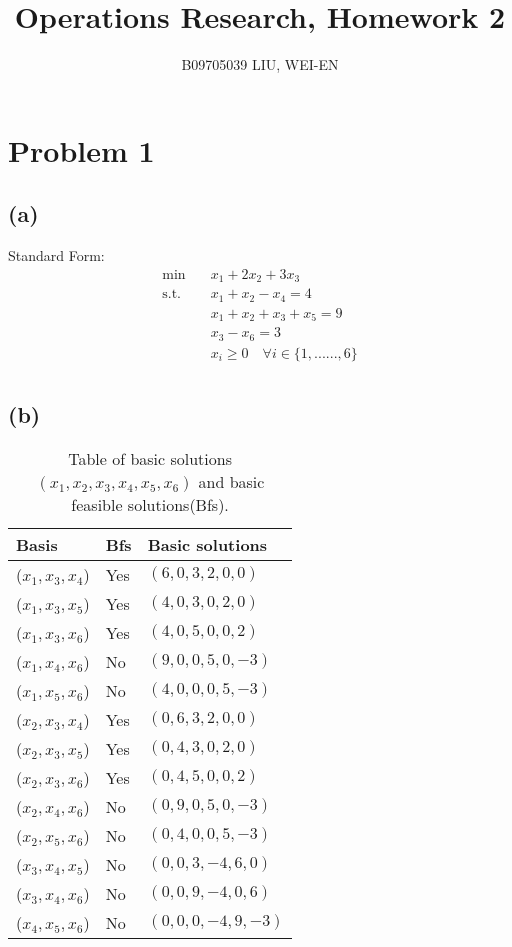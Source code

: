 \documentclass{article}
\title{Operations Research, Homework 2}
\author{B09705039 LIU, WEI-EN}
\date{}
\begin{document}
\maketitle

\section{Problem 1}

\subsection{(a)}

Standard Form:
\begin{equation}\label{eq:LP}\begin{split}
	\min \quad & x_1 + 2x_2 + 3x_3\\
	\mbox{s.t.} \quad 
	& x_1 + x_2 - x_4 = 4\\
	& x_1 + x_2 + x_3 + x_5 = 9\\
	& x_3 - x_6 = 3\\
	& x_i \geq 0 \quad \forall i \in \{1,......, 6\}\\
\end{split}\end{equation}

\subsection{(b)}

\begin{table}[htbp]
\centering
\begin{tabularx}{1\textwidth}
{ | >{\centering\arraybackslash}X 
  | >{\centering\arraybackslash}X 
  | >{\centering\arraybackslash}X |} \hline
Basis & Bfs & Basic solutions \\\hline
($x_1, x_3, x_4$) & Yes & $(6, 0, 3, 2, 0, 0)$ \\\hline
($x_1, x_3, x_5$) & Yes & $(4, 0, 3, 0, 2, 0)$ \\\hline
($x_1, x_3, x_6$) & Yes & $(4, 0, 5, 0, 0, 2)$ \\\hline
($x_1, x_4, x_6$) & No & $(9, 0, 0, 5, 0, -3)$ \\\hline
($x_1, x_5, x_6$) & No & $(4, 0, 0, 0, 5, -3)$ \\\hline
($x_2, x_3, x_4$) & Yes & $(0, 6, 3, 2, 0, 0)$ \\\hline
($x_2, x_3, x_5$) & Yes & $(0, 4, 3, 0, 2, 0)$ \\\hline
($x_2, x_3, x_6$) & Yes & $(0, 4, 5, 0, 0, 2)$ \\\hline
($x_2, x_4, x_6$) & No & $(0, 9, 0, 5, 0, -3)$ \\\hline
($x_2, x_5, x_6$) & No & $(0, 4, 0, 0, 5, -3)$ \\\hline
($x_3, x_4, x_5$) & No & $(0, 0, 3, -4, 6, 0)$ \\\hline
($x_3, x_4, x_6$) & No & $(0, 0, 9, -4, 0, 6)$ \\\hline
($x_4, x_5, x_6$) & No & $(0, 0, 0, -4, 9, -3)$ \\\hline
\end{tabularx}
\caption{\label{tab:widgets}Table of basic solutions $(x_1, x_2, x_3, x_4, x_5, x_6)$ and basic feasible solutions(Bfs).}
\end{table}
\end{document}
